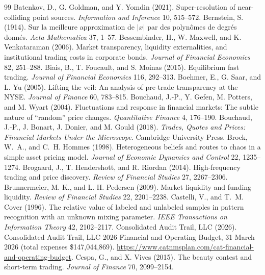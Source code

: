 \begin{thebibliography}{99}
 Batenkov, D., G. Goldman, and Y. Yomdin (2021). Super-resolution of near-colliding point sources. \emph{Information and Inference} 10, 515--572.
 Bernstein, S. (1914). Sur la meilleure approximation de $|x|$ par des polyn\^omes de degr\'es donn\'es. \emph{Acta Mathematica} 37, 1--57.
 Bessembinder, H., W. Maxwell, and K. Venkataraman (2006). Market transparency, liquidity externalities, and institutional trading costs in corporate bonds. \emph{Journal of Financial Economics} 82, 251--288.
 Biais, B., T. Foucault, and S. Moinas (2015). Equilibrium fast trading. \emph{Journal of Financial Economics} 116, 292--313.
 Boehmer, E., G. Saar, and L. Yu (2005). Lifting the veil: An analysis of pre-trade transparency at the NYSE. \emph{Journal of Finance} 60, 783--815.
 Bouchaud, J.-P., Y. Gefen, M. Potters, and M. Wyart (2004). Fluctuations and response in financial markets: The subtle nature of ``random'' price changes. \emph{Quantitative Finance} 4, 176--190.
 Bouchaud, J.-P., J. Bonart, J. Donier, and M. Gould (2018). \emph{Trades, Quotes and Prices: Financial Markets Under the Microscope}. Cambridge University Press.
 Brock, W.~A., and C.~H. Hommes (1998). Heterogeneous beliefs and routes to chaos in a simple asset pricing model. \emph{Journal of Economic Dynamics and Control} 22, 1235--1274.
 Brogaard, J., T. Hendershott, and R. Riordan (2014). High-frequency trading and price discovery. \emph{Review of Financial Studies} 27, 2267--2306.
 Brunnermeier, M. K., and L. H. Pedersen (2009). Market liquidity and funding liquidity. \emph{Review of Financial Studies} 22, 2201--2238.
 Castelli, V., and T.~M. Cover (1996). The relative value of labeled and unlabeled samples in pattern recognition with an unknown mixing parameter. \emph{IEEE Transactions on Information Theory} 42, 2102--2117.
 Consolidated Audit Trail, LLC (2026). Consolidated Audit Trail, LLC 2026 Financial and Operating Budget, 31 March 2026 (total expenses \$147{,}044{,}869). \url{https://www.catnmsplan.com/cat-financial-and-operating-budget}.
 Cespa, G., and X. Vives (2015). The beauty contest and short-term trading. \emph{Journal of Finance} 70, 2099--2154.

\end{thebibliography}
